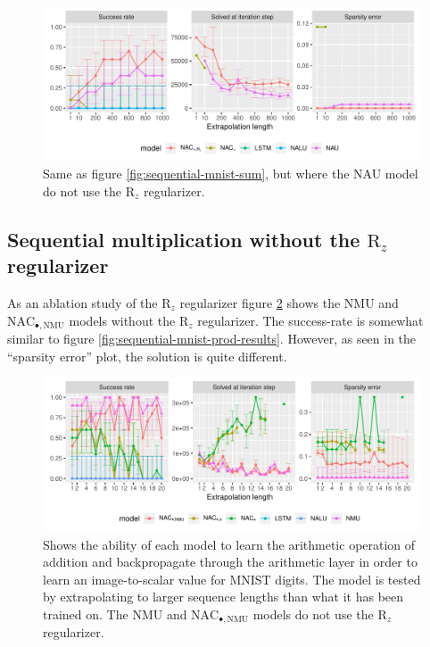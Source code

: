 \begin{figure}[h]
\centering
\includegraphics[width=\linewidth,trim={0 0.5cm 0 0},clip]{paper/results/sequential_mnist_sum_long_ablation.pdf}
\caption{Same as figure \ref{fig:sequential-mnist-sum}, but where the NAU model do not use the $\mathrm{R}_z$ regularizer.} 
\label{fig:sequential-mnist-sum-ablation}
\end{figure}

\subsection{Sequential multiplication without the \texorpdfstring{$\mathrm{R}_z$}{R\_z} regularizer}
\label{sec:appendix:sequential-mnist:ablation}

As an ablation study of the $\mathrm{R}_z$ regularizer figure \ref{fig:sequential-mnist-prod-ablation} shows the NMU and $\mathrm{NAC}_{\bullet,\mathrm{NMU}}$ models without the $\mathrm{R}_z$ regularizer. The success-rate is somewhat similar to figure \ref{fig:sequential-mnist-prod-results}. However, as seen in the ``sparsity error'' plot, the solution is quite different.

\begin{figure}[h]
\centering
\includegraphics[width=\linewidth,trim={0 0.5cm 0 0},clip]{results/sequential_mnist_prod_long_ablation.pdf}
\caption{Shows the ability of each model to learn the arithmetic operation of addition and backpropagate through the arithmetic layer in order to learn an image-to-scalar value for MNIST digits. The model is tested by extrapolating to larger sequence lengths than what it has been trained on. The NMU and $\mathrm{NAC}_{\bullet,\mathrm{NMU}}$ models do not use the $\mathrm{R}_z$ regularizer.} 
\label{fig:sequential-mnist-prod-ablation}
\end{figure}